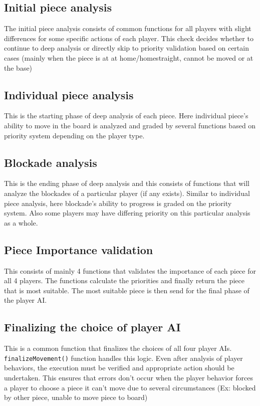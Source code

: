 \documentclass[12pt, a4paper]{report}
\begin{document}
\subsection{Initial piece analysis}
The initial piece analysis consists of common functions for all players with slight differences for some specific actions of each player. This check decides whether to continue to deep analysis or directly skip to priority validation based on certain cases (mainly when the piece is at at home/homestraight, cannot be moved or at the base)

\subsection{Individual piece analysis}
This is the starting phase of deep analysis of each piece. Here individual piece's ability to move in the board is analyzed and graded by several functions based on priority system depending on the player type.

\subsection{Blockade analysis}
This is the ending phase of deep analysis and this consists of functions that will analyze the blockades of a particular player (if any exists). Similar to individual piece analysis, here blockade's ability to progress is graded on the priority system. Also some players may have differing priority on this particular analysis as a whole.

\subsection{Piece Importance validation}
This consists of mainly 4 functions that validates the importance of each piece for all 4 players. The functions calculate the priorities and finally return the piece that is most suitable. The most suitable piece is then send for the final phase of the player AI.

\subsection{Finalizing the choice of player AI}
This is a common function that finalizes the choices of all four player AIs. \lstinline|finalizeMovement()| function handles this logic. Even after analysis of player behaviors, the execution must be verified and appropriate action should be undertaken. This ensures that errors don't occur when the player behavior forces a player to choose a piece it can't move due to several circumstances (Ex: blocked by other piece, unable to move piece to board)
\end{document}
